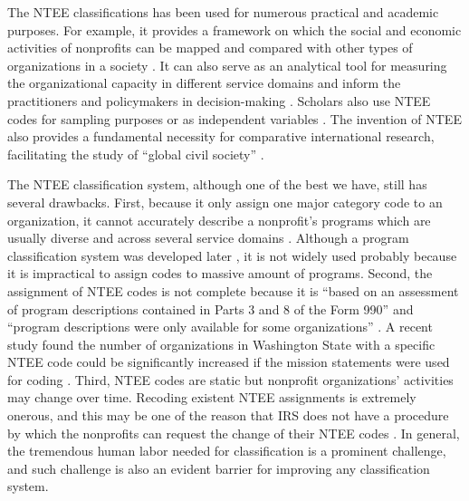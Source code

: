 \documentclass[11pt]{article}
\begin{document}
The NTEE classifications has been used for numerous practical and academic purposes. For example, it provides a framework on which the social and economic activities of nonprofits can be mapped and compared with other types of organizations in a society \parencite[e.g.,][]{RoegerNonprofitSectorIts2015}. It can also serve as an analytical tool for measuring the organizational capacity in different service domains and inform the practitioners and policymakers in decision-making \parencite{Hodgkinsonnewresearchplanning1991}. Scholars also use NTEE codes for sampling purposes \parencite[e.g.,][]{OktenDeterminantsdonationsprivate2000,CarmanEvaluationCapacityNonprofit2010} or as independent variables \parencite{SloanEffectsNonprofitAccountability2009}. The invention of NTEE also provides a fundamental necessity for comparative international research, facilitating the study of ``global civil society'' \parencite{VakilConfrontingclassificationproblem1997,Salamonsearchnonprofitsector1992,Salamoninternationalclassificationnonprofit1996,HodgkinsonMappingnonprofitsector1990}.

The NTEE classification system, although one of the best we have, still has several drawbacks. First, because it only assign one major category code to an organization, it cannot accurately describe a nonprofit's programs which are usually diverse and across several service domains \parencite[303]{GronbjergUsingNTEEclassify1994}. Although a program classification system was developed later \parencite{LampkinIntroducingNonprofitProgram2001}, it is not widely used probably because it is impractical to assign codes to massive amount of programs. Second, the assignment of NTEE codes is not complete because it is ``based on an assessment of program descriptions contained in Parts 3 and 8 of the Form 990'' and ``program descriptions were only available for some organizations'' \parencite[16]{NationalCenterforCharitableStatisticsGuideUsingNCCS2006}. A recent study found the number of organizations in Washington State with a specific NTEE code could be significantly increased if the mission statements were used for coding \parencite{FyallNTEECodesOpportunities2018}. Third, NTEE codes are static but nonprofit organizations' activities may change over time. Recoding existent NTEE assignments is extremely onerous, and this may be one of the reason that IRS does not have a procedure by which the nonprofits can request the change of their NTEE codes \parencite{USInternalRevenueServiceIRSStaticFiles2013}. In general, the tremendous human labor needed for classification is a prominent challenge, and such challenge is also an evident barrier for improving any classification system.
\end{document}
